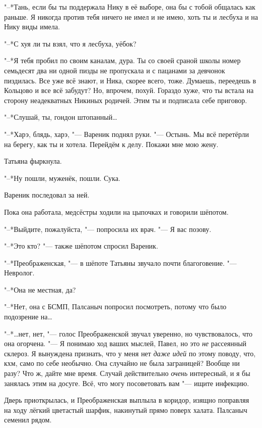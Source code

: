 "--*Тань, если бы ты поддержала Нику в её выборе, она бы с тобой общалась как раньше.
Я никогда против тебя ничего не имел и не имею, хоть ты и лесбуха и на Нику виды имела.

"--*С хуя ли ты взял, что я лесбуха, уёбок?

"--*Я тебя пробил по своим каналам, дура.
Ты со своей сраной школы номер семьдесят два ни одной пизды не пропускала и с пацанами за девчонок пиздилась.
Все уже всё знают, и Ника, скорее всего, тоже.
Думаешь, переедешь в Кольцово и все всё забудут?
Но, впрочем, похуй.
Гораздо хуже, что ты встала на сторону неадекватных Никиных родичей.
Этим ты и подписала себе приговор.

"--*Слушай, ты, гондон штопанный\ldots{}

"--*Харэ, блядь, харэ, "--- Вареник поднял руки.
"--- Остынь.
Мы всё перетёрли на берегу, как ты и хотела.
Перейдём к делу.
Покажи мне мою жену.

Татьяна фыркнула.

"--*Ну пошли, муженёк, пошли.
Сука.

Вареник последовал за ней.

\asterism

\textspace

Пока она работала, медсёстры ходили на цыпочках и говорили шёпотом.

"--*Выйдите, пожалуйста, "--- попросила их врач.
"--- Я вас позову.

"--*Это кто? "--- также шёпотом спросил Вареник.

"--*Преображенская, "--- в шёпоте Татьяны звучало почти благоговение.
"--- Невролог.

"--*Она не местная, да?

"--*Нет, она с БСМП, Палсаныч попросил посмотреть, потому что было подозрение на\ldots{}

"--*\ldots{}нет, нет, "--- голос Преображенской звучал уверенно, но чувствовалось, что она огорчена.
"--- Я понимаю ход ваших мыслей, Павел, но это \emph{не} рассеянный склероз.
Я вынуждена признать, что у меня нет \emph{даже идей} по этому поводу, что, кхм, само по себе необычно.
Она случайно не была заграницей?
Вообще ни разу?
Что ж, дайте мне время.
Случай действительно \emph{очень} интересный, и я бы занялась этим на досуге.
Всё, что могу посоветовать вам "--- ищите инфекцию.

Дверь приоткрылась, и Преображенская выплыла в коридор, изящно поправляя на ходу лёгкий цветастый шарфик, накинутый прямо поверх халата.
Палсаныч семенил рядом.

